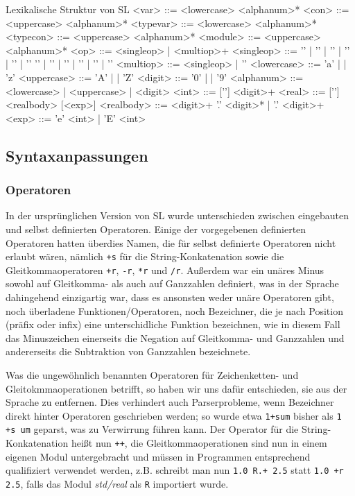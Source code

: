 \documentclass[runningheads]{llncs}
\begin{document}
\begin{grammarfigure}{Lexikalische Struktur von SL}
<var>       ::= <lowercase> <alphanum>*
<con>       ::= <uppercase> <alphanum>*
<typevar>   ::= <lowercase> <alphanum>*
<typecon>   ::= <uppercase> <alphanum>*
<module>    ::= <uppercase> <alphanum>*
<op>        ::= <singleop> | <multiop>+
<singleop>  ::= '\exclamationOp' | '\paragraphOp' | '\percentOp' | '\ampOp' | '\divint' | '\questionOp' 
           \alt '\addint' | '\mulint' | '\sharpOp' | '\subint' | '\ltint' | '\gtint'
<multiop>   ::= <singleop> | '\eq'
<lowercase> ::= 'a' | \cdots | 'z'
<uppercase> ::= 'A' | \cdots | 'Z'
<digit>     ::= '0' | \cdots | '9'
<alphanum>  ::= <lowercase> | <uppercase> | <digit>
<int>       ::= ['\subint'] <digit>+
<real>      ::= ['\subint'] <realbody> [<exp>]
<realbody>  ::= <digit>+ '.' <digit>* | '.' <digit>+
<exp>       ::= 'e' <int> | 'E' <int>
\end{grammarfigure}

\subsection{Syntaxanpassungen}

\subsubsection{Operatoren}

In der ursprünglichen Version von SL wurde unterschieden zwischen
eingebauten und selbst definierten Operatoren. Einige der vorgegebenen
definierten Operatoren hatten überdies Namen, die für selbst
definierte Operatoren nicht erlaubt wären, nämlich \verb|+s| für die
String-Konkatenation sowie die Gleitkommaoperatoren \verb|+r|,
\verb|-r|, \verb|*r| und \verb|/r|. Außerdem war ein unäres Minus
sowohl auf Gleitkomma- als auch auf Ganzzahlen definiert, was in der
Sprache dahingehend einzigartig war, dass es ansonsten weder unäre
Operatoren gibt, noch überladene Funktionen/Operatoren, noch
Bezeichner, die je nach Position (präfix oder infix) eine
unterschidliche Funktion bezeichnen, wie in diesem Fall das
Minuszeichen einerseits die Negation auf Gleitkomma- und Ganzzahlen
und andererseits die Subtraktion von Ganzzahlen bezeichnete.

Was die ungewöhnlich benannten Operatoren für Zeichenketten- und
Gleitokmmaoperationen betrifft, so haben wir uns dafür entschieden, sie
aus der Sprache zu entfernen.  Dies verhindert auch Parserprobleme,
wenn Bezeichner direkt hinter Operatoren geschrieben werden; so wurde
etwa \verb|1+sum| bisher als \verb|1 +s um| geparst, was zu Verwirrung
führen kann.  Der Operator für die String-Konkatenation heißt nun
\verb|++|, die Gleitkommaoperationen sind nun in einem eigenen Modul
untergebracht und müssen in Programmen entsprechend qualifiziert
verwendet werden, z.B. schreibt man nun \verb|1.0 R.+ 2.5| statt
\verb|1.0 +r 2.5|, falls das Modul \emph{std/real} als \verb|R|
importiert wurde.
\end{document}
